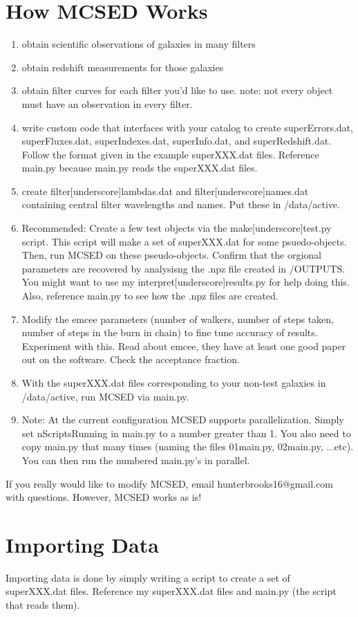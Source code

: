 \documentclass[12pt,a4paper]{article}
\begin{document}
\section{How MCSED Works}

\begin{enumerate}
\item obtain scientific observations of galaxies in many filters
\item obtain redshift measurements for those galaxies
\item obtain filter curves for each filter you'd like to use. note: not every object must have an observation in every filter.
\item write custom code that interfaces with your catalog to create superErrors.dat, superFluxes.dat, superIndexes.dat, superInfo.dat, and superRedshift.dat.  Follow the format given in the example superXXX.dat files.  Reference main.py because main.py reads the superXXX.dat files.  
\item create filter[underscore]lambdas.dat and filter[underscore]names.dat containing central filter wavelengths and names.  Put these in /data/active.
\item Recommended: Create a few test objects via the make[underscore]test.py script.  This script will make a set of superXXX.dat for some psuedo-objects.  Then, run MCSED on these pseudo-objects.  Confirm that the orgional parameters are recovered by analysisng the .npz file created in /OUTPUTS.  You might want to use my interpret[underscore]results.py for help doing this.  Also, reference main.py to see how the .npz files are created. 
\item Modify the emcee parameters (number of walkers, number of steps taken, number of steps in the burn in chain) to fine tune accuracy of results.  Experiment with this.  Read about emcee, they have at least one good paper out on the software.  Check the acceptance fraction.
\item With the superXXX.dat files corresponding to your non-test galaxies in /data/active, run MCSED via main.py. 
\item Note: At the current configuration MCSED supports parallelization.  Simply set nScriptsRunning in main.py to a number greater than 1.  You also need to copy main.py that many times (naming the files 01main.py, 02main.py, ...etc).  You can then run the numbered main.py's in parallel. 
\end{enumerate}



If you really would like to modify MCSED, email hunterbrooks16@gmail.com with questions.  However, MCSED works as is!








\section{Importing Data}

Importing data is done by simply writing a script to create a set of superXXX.dat files.  Reference my superXXX.dat files and main.py (the script that reads them). 
\end{document}
